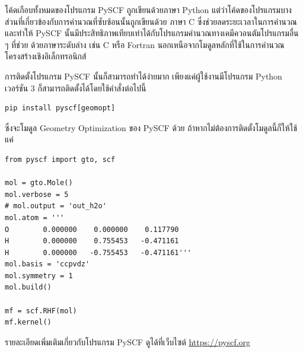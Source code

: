 โค้ดเกือบทั้งหมดของโปรแกรม PySCF ถูกเขียนด้วยภาษา Python แต่ว่าโค้ดของโปรแกรมบางส่วนที่เกี่ยวข้องกับการคำนวณที่ซับซ้อนนั้นถูกเขียนด้วย%
ภาษา C ซึ่งช่วยลดระยะเวลาในการคำนวณและทำให้ PySCF นั้นมีประสิทธิภาพเทียบเท่าได้กับโปรแกรมคำนวณทางเคมีควอนตัมโปรแกรมอื่น ๆ ที่ช่วย%
ด้วยภาษาระดับล่าง เช่น C หรือ Fortran นอกเหนือจากโมดูลหลักที่ใช้ในการคำนวณโครงสร้างเชิงอิเล็กทรอนิกส์

การติดตั้งโปรแกรม PySCF นั้นก็สามารถทำได้ง่ายมาก เพียงแค่ผู้ใช้งานมีโปรแกรม Python เวอร์ชัน 3 ก็สามารถติดตั้งได้โดยใช้คำสั่งต่อไปนี้

\begin{lstlisting}[style=MyBash]
pip install pyscf[geomopt]
\end{lstlisting}

\vspace{1em}
\noindent ซึ่งจะโมดูล Geometry Optimization ของ PySCF ด้วย ถ้าหากไม่ต้องการติดตั้งโมดูลนี้ก็ให้ใช้แค่ 

\begin{lstlisting}[style=MyPython]
from pyscf import gto, scf

mol = gto.Mole()
mol.verbose = 5
# mol.output = 'out_h2o'
mol.atom = '''
O        0.000000    0.000000    0.117790
H        0.000000    0.755453   -0.471161
H        0.000000   -0.755453   -0.471161'''
mol.basis = 'ccpvdz'
mol.symmetry = 1
mol.build()

mf = scf.RHF(mol)
mf.kernel()
\end{lstlisting}

\vspace{1em}

รายละเอียดเพิ่มเติมเกี่ยวกับโปรแกรม PySCF ดูได้ที่เว็บไซต์ \url{https://pyscf.org}
